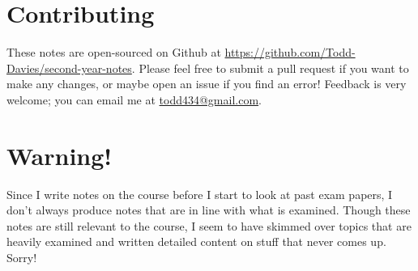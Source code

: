 \section*{Contributing}

These notes are open-sourced on Github at
\url{https://github.com/Todd-Davies/second-year-notes}. Please feel free to
submit a pull request if you want to make any changes, or maybe open an issue
if you find an error! Feedback is very welcome; you can email me at
\href{mailto:todd434@gmail.com}{todd434@gmail.com}.

\section*{Warning!}

Since I write notes on the course before I start to look at past exam papers, I
don't always produce notes that are in line with what is examined. Though these
notes are still relevant to the course, I seem to have skimmed over topics that
are heavily examined and written detailed content on stuff that never comes up.
Sorry!

